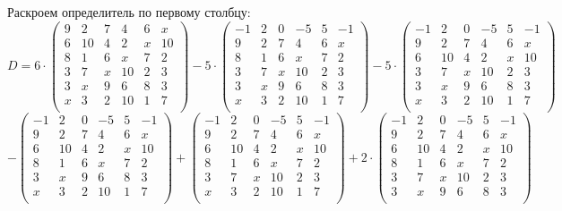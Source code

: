 	    Раскроем определитель по первому столбцу: 
		\[ 
		D = 6 \cdot
		\begin{pmatrix}
		9 & 2 & 7 & 4 & 6 & x \\
		6 & 10 & 4 & 2 & x & 10 \\
		8 & 1 & 6 & x & 7 & 2 \\
		3 & 7 & x & 10 & 2 & 3 \\
		3 & x & 9 & 6 & 8 & 3 \\
		x & 3 & 2 & 10 & 1 & 7 \\
		\end{pmatrix} 
		-5 \cdot 
		\begin{pmatrix}
		-1 & 2 & 0 & -5 & 5 & -1 \\
		9 & 2 & 7 & 4 & 6 & x \\
		8 & 1 & 6 & x & 7 & 2 \\
		3 & 7 & x & 10 & 2 & 3 \\
		3 & x & 9 & 6 & 8 & 3 \\
		x & 3 & 2 & 10 & 1 & 7 \\
		\end{pmatrix}
		-5 \cdot 
		\begin{pmatrix}
		-1 & 2 & 0 & -5 & 5 & -1 \\
		9 & 2 & 7 & 4 & 6 & x \\
		6 & 10 & 4 & 2 & x & 10 \\
		3 & 7 & x & 10 & 2 & 3 \\
		3 & x & 9 & 6 & 8 & 3 \\
		x & 3 & 2 & 10 & 1 & 7 \\
		\end{pmatrix}
		\]
		\[
		-
		\begin{pmatrix}
		-1 & 2 & 0 & -5 & 5 & -1 \\
		9 & 2 & 7 & 4 & 6 & x \\
		6 & 10 & 4 & 2 & x & 10 \\
		8 & 1 & 6 & x & 7 & 2 \\
		3 & x & 9 & 6 & 8 & 3 \\
		x & 3 & 2 & 10 & 1 & 7 \\
		\end{pmatrix}
		+ 
		\begin{pmatrix}
		-1 & 2 & 0 & -5 & 5 & -1 \\
		9 & 2 & 7 & 4 & 6 & x \\
		6 & 10 & 4 & 2 & x & 10 \\
		8 & 1 & 6 & x & 7 & 2 \\
		3 & 7 & x & 10 & 2 & 3 \\
		x & 3 & 2 & 10 & 1 & 7 \\
		\end{pmatrix}
		+ 2 \cdot 
		\begin{pmatrix}
		-1 & 2 & 0 & -5 & 5 & -1 \\
		9 & 2 & 7 & 4 & 6 & x \\
		6 & 10 & 4 & 2 & x & 10 \\
		8 & 1 & 6 & x & 7 & 2 \\
		3 & 7 & x & 10 & 2 & 3 \\
		3 & x & 9 & 6 & 8 & 3 \\
		\end{pmatrix}
		\]  
		
